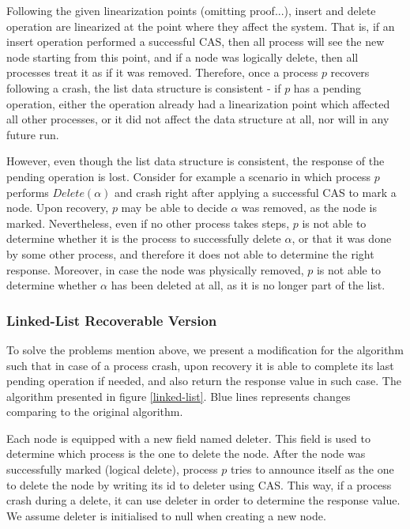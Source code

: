 Following the given linearization points (omitting proof...), insert and delete operation are linearized at the point where they affect the system. That is, if an insert operation performed a successful CAS, then all process will see the new node starting from this point, and if a node was logically delete, then all processes treat it as if it was removed. Therefore, once a process $p$ recovers following a crash, the list data structure is consistent - if $p$ has a pending operation, either the operation already had a linearization point which affected all other processes, or it did not affect the data structure at all, nor will in any future run.

However, even though the list data structure is consistent, the response of the pending operation is lost. Consider for example a scenario in which process $p$ performs $Delete(\alpha)$ and crash right after applying a successful CAS to mark a node. Upon recovery, $p$ may be able to decide $\alpha$ was removed, as the node is marked. Nevertheless, even if no other process takes steps, $p$ is not able to determine whether it is the process to successfully delete $\alpha$, or that it was done by some other process, and therefore it does not able to determine the right response. Moreover, in case the node was physically removed, $p$ is not able to determine whether $\alpha$ has been deleted at all, as it is no longer part of the list.


\subsubsection{Linked-List Recoverable Version}

To solve the problems mention above, we present a modification for the algorithm such that in case of a process crash, upon recovery it is able to complete its last pending operation if needed, and also return the response value in such case. The algorithm presented in figure \ref{linked-list}. Blue lines represents changes comparing to the original algorithm.

Each node is equipped with a new field named deleter. This field is used to determine which process is the one to delete the node. After the node was successfully marked (logical delete), process $p$ tries to announce itself as the one to delete the node by writing its id to deleter using CAS. This way, if a process crash during a delete, it can use deleter in order to determine the response value. We assume deleter is initialised to null when creating a new node.


